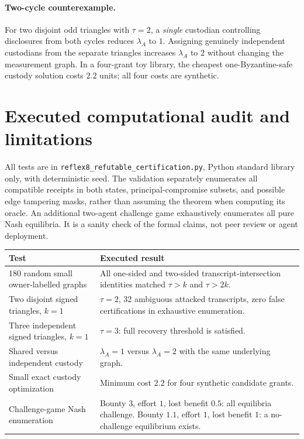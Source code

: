 \documentclass[10pt,a4paper]{article}
\begin{document}
\paragraph{Two-cycle counterexample.} For two disjoint odd triangles with $\tau=2$, a \emph{single} custodian controlling disclosures from both cycles reduces $\lambda_A$ to $1$. Assigning genuinely independent custodians from the separate triangles increases $\lambda_A$ to $2$ without changing the measurement graph. In a four-grant toy library, the cheapest one-Byzantine-safe custody solution costs $2.2$ units; all four costs are synthetic.

\section{Executed computational audit and limitations}
All tests are in \texttt{reflex8\_refutable\_certification.py}, Python standard library only, with deterministic seed. The validation separately enumerates all compatible receipts in both states, principal-compromise subsets, and possible edge tampering masks, rather than assuming the theorem when computing its oracle. An additional two-agent challenge game exhaustively enumerates all pure Nash equilibria. It is a sanity check of the formal claims, not peer review or agent deployment.
\begin{center}\small
\begin{tabularx}{\linewidth}{@{}p{.43\linewidth}X@{}}\toprule
\textbf{Test} & \textbf{Executed result}\\
\midrule
180 random small owner-labelled graphs & All one-sided and two-sided transcript-intersection identities matched $\tau>k$ and $\tau>2k$.\\
Two disjoint signed triangles, $k=1$ & $\tau=2$, 32 ambiguous attacked transcripts, zero false certifications in exhaustive enumeration.\\
Three independent signed triangles, $k=1$ & $\tau=3$: full recovery threshold is satisfied.\\
Shared versus independent custody & $\lambda_A=1$ versus $\lambda_A=2$ with the same underlying graph.\\
Small exact custody optimization & Minimum cost $2.2$ for four synthetic candidate grants.\\
Challenge-game Nash enumeration & Bounty $3$, effort $1$, lost benefit $0.5$: all equilibria challenge. Bounty $1.1$, effort $1$, lost benefit $1$: a no-challenge equilibrium exists.\\
\bottomrule
\end{tabularx}
\end{center}
\end{document}
